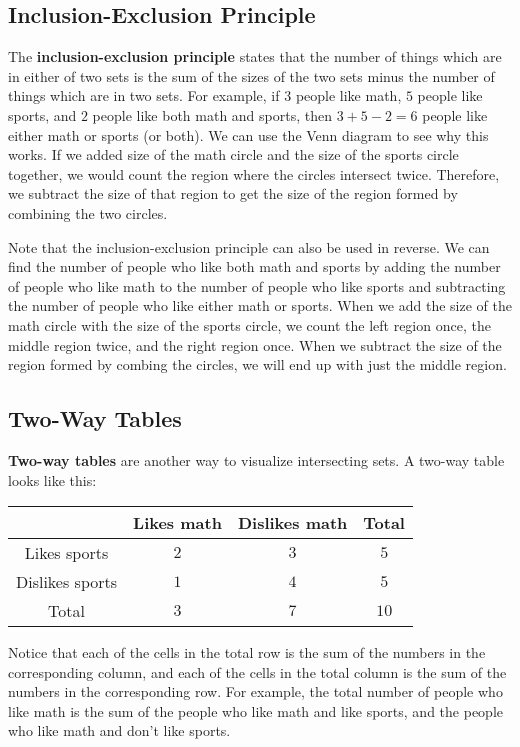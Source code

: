 \documentclass[twocolumn]{article}
\begin{document}
\subsection*{Inclusion-Exclusion Principle}
The \textbf{inclusion-exclusion principle} states that the number of things 
which are in either of two sets is the sum of the sizes of the two sets minus 
the number of things which are in two sets. For example, if $3$ people like 
math, $5$ people like sports, and $2$ people like both math and sports, then $3 
+ 5 - 2 = 6$ people like either math or sports (or both). We can use the Venn 
diagram to see why this works. If we added size of the math circle and the size 
of the sports circle together, we would count the region where the circles 
intersect twice. Therefore, we subtract the size of that region to get the size 
of the region formed by combining the two circles.

Note that the inclusion-exclusion principle can also be used in reverse. We can 
find the number of people who like both math and sports by adding the number of 
people who like math to the number of people who like sports and subtracting the 
number of people who like either math or sports. When we add the size of the 
math circle with the size of the sports circle, we count the left region once, 
the middle region twice, and the right region once. When we subtract the size of 
the region formed by combing the circles, we will end up with just the middle 
region.

\subsection*{Two-Way Tables}
\textbf{Two-way tables} are another way to visualize intersecting sets. A 
two-way table looks like this:
\begin{center}
	\begin{tabular}{| c | c | c | c |}
		\hline
                        & Likes math & Dislikes math & Total \\
		\hline
		Likes sports    & $2$        & $3$           & $5$   \\
		\hline
		Dislikes sports & $1$        & $4$           & $5$   \\
		\hline
		Total           & $3$        & $7$           & $10$  \\
		\hline
	\end{tabular}
\end{center}

Notice that each of the cells in the total row is the sum of the numbers in the 
corresponding column, and each of the cells in the total column is the sum of 
the numbers in the corresponding row. For example, the total number of people 
who like math is the sum of the people who like math and like sports, and the 
people who like math and don't like sports.
\end{document}
